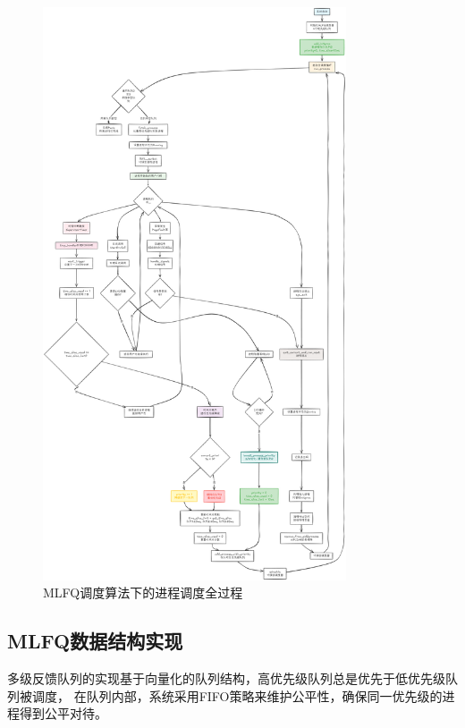 \begin{figure}[htbp]
    \centering
    \includegraphics[width=0.8\textwidth]{../image/MLFQ进程调度过程.png}
    \caption{MLFQ调度算法下的进程调度全过程}
    \label{fig:mlfq-scheduling}
\end{figure}

\clearpage

\subsection{MLFQ数据结构实现}

多级反馈队列的实现基于向量化的队列结构，高优先级队列总是优先于低优先级队列被调度，
在队列内部，系统采用FIFO策略来维护公平性，确保同一优先级的进程得到公平对待。

